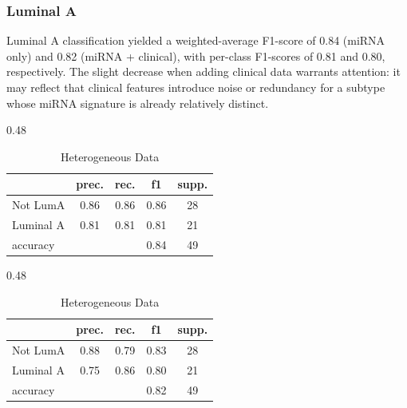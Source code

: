 \subsubsection{Luminal A}

Luminal A classification yielded a weighted-average F1-score of 0.84 (miRNA only) 
and 0.82 (miRNA + clinical), with per-class F1-scores of 0.81 and 0.80, respectively. 
The slight decrease when adding clinical data warrants attention: it may reflect 
that clinical features introduce noise or redundancy for a subtype whose miRNA 
signature is already relatively distinct.

\begin{table}[H]
    \centering
    \caption{Classification Performance for Luminal A Subtype}
    \begin{subtable}{0.48\textwidth}
        \centering
        \caption{Homogeneous Data}
        \begin{tabular}{lcccc}
            \toprule
            & prec. & rec. & f1 & supp. \\
            \midrule
            Not LumA & 0.86 & 0.86 & 0.86 & 28 \\
            Luminal A & 0.81 & 0.81 & 0.81 & 21 \\
            \midrule
            accuracy &      &      & 0.84 & 49 \\
            \bottomrule
        \end{tabular}
    \end{subtable}
    \hfill
    \begin{subtable}{0.48\textwidth}
        \centering
        \caption{Heterogeneous Data}
        \begin{tabular}{lcccc}
            \toprule
            & prec. & rec. & f1 & supp. \\
            \midrule
            Not LumA & 0.88 & 0.79 & 0.83 & 28 \\
            Luminal A & 0.75 & 0.86 & 0.80 & 21 \\
            \midrule
            accuracy &      &      & 0.82 & 49 \\
            \bottomrule
        \end{tabular}
    \end{subtable}
\end{table}

